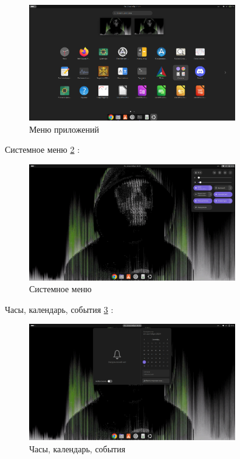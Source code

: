 \begin{figure}[!h]
    \centering
    \includegraphics[width = 0.8\textwidth]{images/menuApplications.png}
    
    \caption{Меню приложений}
    
    \label{fig:menuApplications}
\end{figure}

Системное меню \ref{fig:menuSystem} :

\begin{figure}[!h]
    \centering
    \includegraphics[width = 0.8\textwidth]{images/menuSystem.png}
    
    \caption{Системное меню}
    
    \label{fig:menuSystem}
\end{figure}

\newpage

Часы, календарь, события \ref{fig:desktopUbuntuCalendar} :

\begin{figure}[!h]
    \centering
    \includegraphics[width = 0.8\textwidth]{images/desktopUbuntuCalendar.png}
    
    \caption{Часы, календарь, события}
    
    \label{fig:desktopUbuntuCalendar}
\end{figure}

